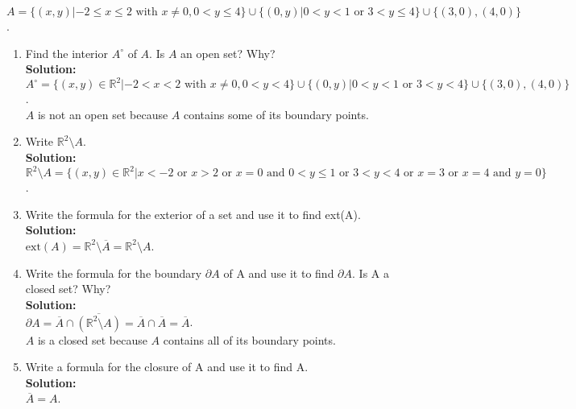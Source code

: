 \documentclass{article}
\begin{document}
\begin{enumerate}
    $A=\{(x,y)|-2\leq x\leq 2 \text{ with } x\neq 0, 0<y\leq 4\} \cup \{(0,y)|0<y<1 \text{ or } 3<y\leq 4\} \cup \{(3,0),(4,0)\}$.

\begin{enumerate}

\item Find the interior $A^\circ$ of $A$. Is $A$ an open set? Why?\\

\textbf{Solution:} \\
$A^\circ = \{(x,y) \in \mathbb{R}^2 |-2<x<2 \text{ with } x\neq 0, 0<y<4\} \cup \{(0,y) | 0<y<1 \text{ or } 3<y<4\} \cup \{(3,0),(4,0)\}$. \\
$A$ is not an open set because $A$ contains some of its boundary points.\\


\item Write $\mathbb{R}^2 \setminus A$.\\

\textbf{Solution:} \\
$\mathbb{R}^2 \setminus A = \{(x,y) \in \mathbb{R}^2 | x<-2 \text{ or } x>2 \text{ or } x=0 \text{ and } 0<y\leq 1 \text{ or } 3<y<4 \text{ or } x=3 \text{ or } x=4 \text{ and } y=0\}$.\\

\item Write the formula for the exterior of a set and use it to find ext(A).\\

\textbf{Solution:} \\
$\text{ext}(A) = \mathbb{R}^2 \setminus \overline{A} = \mathbb{R}^2 \setminus A$.\\

\item  Write the formula for the boundary $\partial A$ of A and use it to find $\partial A$. Is A a closed set? Why?\\

\textbf{Solution:} \\
$\partial A = \overline{A} \cap \overline{(\mathbb{R}^2 \setminus A)} = \overline{A} \cap \overline{A} = \overline{A}$. \\
$A$ is a closed set because $A$ contains all of its boundary points.\\

\item Write a formula for the closure of A and use it to find A.\\

\textbf{Solution:} \\
$\overline{A} = A$.\\


\end{enumerate}
\end{enumerate}
\end{document}
